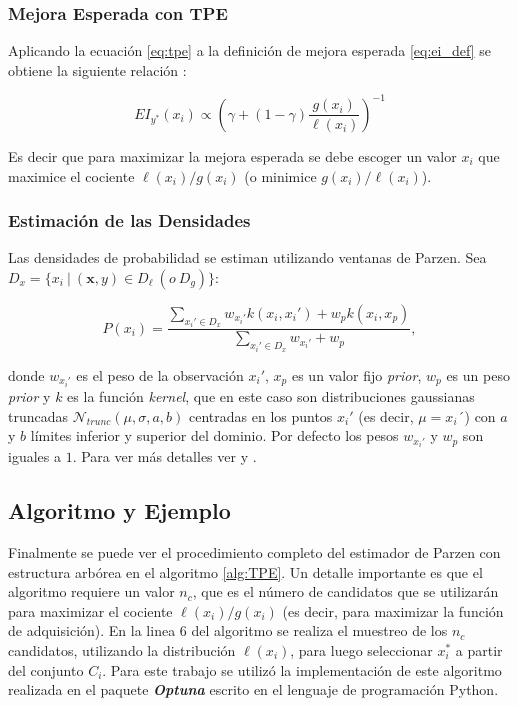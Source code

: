 \subsubsection*{Mejora Esperada con TPE}
Aplicando la ecuación \eqref{eq:tpe} a la definición de mejora esperada \eqref{eq:ei_def} se obtiene la siguiente relación \cite{NIPS2011_86e8f7ab}:

\begin{equation}
EI_{y^*}(x_i) \propto \left( \gamma + (1-\gamma) \frac{g(x_i)}{\ell (x_i)} \right)^{-1}
\end{equation}

Es decir que para maximizar la mejora esperada se debe escoger un valor $x_i$ que maximice el cociente $\ell(x_i)/g(x_i)$ (o minimice $g(x_i)/\ell(x_i)$).

\subsubsection*{Estimación de las Densidades}

Las densidades de probabilidad se estiman utilizando ventanas de Parzen. Sea $D_x = \{x_i \ | \ (\textbf{x}, y) \in D_{\ell} \ (o\ D_g) \}$:

\begin{equation}
P(x_i) = \frac{\sum_{x_i'\in D_x}w_{x_i'}k(x_i, x_i') + w_p k(x_i, x_p) }{\sum_{x_i'\in D_x}w_{x_i'}+w_p},
\end{equation}
 

donde $w_{x_i'}$ es el peso de la observación $x_i'$, $x_p$ es un valor fijo \textit{prior}, $w_p$ es un peso \textit{prior} y $k$ es la función \textit{kernel}, que en este caso son distribuciones gaussianas truncadas $\mathcal{N}_{trunc}(\mu, \sigma, a, b)$ centradas en los puntos $x_i'$ (es decir, $\mu = x_i´$) con $a$ y $b$ límites inferior y superior del dominio. Por defecto los pesos $w_{x_i'}$ y $w_p$ son iguales a $1$. Para ver más detalles ver \cite{10.1613/jair.1.13188} y \cite{NIPS2011_86e8f7ab}.


\subsection*{Algoritmo y Ejemplo}

Finalmente se puede ver el procedimiento completo del estimador de Parzen con estructura arbórea en el algoritmo \ref{alg:TPE}. Un detalle importante es que el algoritmo requiere un valor $n_c$, que es el número de candidatos que se utilizarán para maximizar el cociente $\ell(x_i)/g(x_i)$ (es decir, para maximizar la función de adquisición). En la linea 6 del algoritmo se realiza el muestreo de los $n_c$ candidatos, utilizando la distribución $\ell(x_i)$, para luego seleccionar $x_i^*$ a partir del conjunto $C_i$.
Para este trabajo se utilizó la implementación de este algoritmo realizada en el paquete \textbf{\textit{Optuna}} \cite{optuna_2019} escrito en el lenguaje de programación Python.

